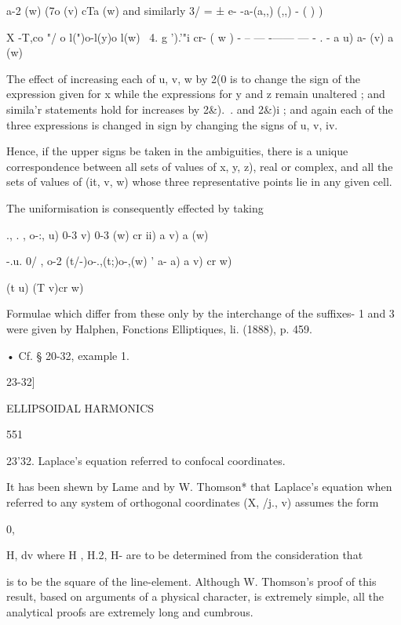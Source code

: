 {{{a-2 (w) (7o (v) cTa (w) 
and similarly 3/ = ± e- -a-(a,,)   (,,)  - ( )   ) 

X -T,co "/  o l(")o-l(y)o l(w) 
  \  4. g ').'"i cr- ( w ) - -- — -—— — - . 
- a u) a- (v) a (w) 

The effect of increasing each of u, v, w by 2(0  is to change the sign of the 
expression given for x while the expressions for y and z remain unaltered ; 
and simila'r statements hold for increases by 2\&).\ . and 2\&)i ; and again each of 
the three expressions is changed in sign by changing the signs of u, v, iv. 

Hence, if the upper signs be taken in the ambiguities, there is a unique 
correspondence between all sets of values of  x, y, z), real or complex, and all 
the sets of values of (it, v, w) whose three representative points lie in any 
given cell. 

The uniformisation is consequently effected by taking 

., . , o-:,  u) 0-3  v) 0-3 (w) 
  cr  ii) a  v) a (w) 

-.u. 0/ , o-2 (t/-)o-.,(t;)o-,(w) 
  '  a-  a) a  v) cr  w) 

(t u) (T v)cr w) 

Formulae which differ from these only by the interchange of the suffixes- 
1 and 3 were given by Halphen, Fonctions Elliptiques, li. (1888), p. 459. 

• Cf. § 20-32, example 1. 



23-32] 



ELLIPSOIDAL HARMONICS 



551 



23'32. Laplace's equation referred to confocal coordinates. 

It has been shewn by Lame and by W. Thomson* that Laplace's equation 
when referred to any system of orthogonal coordinates (X, /j., v) assumes the 
form 






0, 



H,   dv 
where  H , H.2, H-  are to be determined from the consideration that 

is to be the square of the line-element. Although W. Thomson's proof of this 
result, based on arguments of a physical character, is extremely simple, all 
the analytical proofs are extremely long and cumbrous. 

}}}

